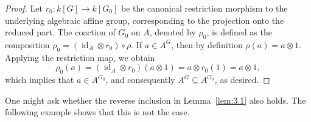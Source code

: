 \documentclass[11pt,a4paper,reqno,noamsfonts]{amsart}
\numberwithin{equation}{section}
\theoremstyle{definition}
\theoremstyle{remark}
\DeclareMathOperator{\id}{id}
\begin{document}
\begin{proof}
Let $r_0 \colon k[G] \to k[G_0]$ be the canonical restriction morphism to the underlying algebraic affine group, corresponding to the projection onto the reduced part. The coaction of $G_0$ on $A$, denoted by $\rho_0$, is defined as the composition $\rho_0 = (\id_A \otimes r_0) \circ \rho$. If $a \in A^{G}$, then by definition $\rho(a) = a \otimes 1$. Applying the restriction map, we obtain
$$
\rho_0(a) = (\id_A \otimes r_0)(a \otimes 1) = a \otimes r_0(1) = a \otimes 1,
$$
which implies that $a \in A^{G_0}$, and consequently $A^{G} \subseteq A^{G_0}$, as desired.
\end{proof}

One might ask whether the reverse inclusion in Lemma~\ref{lem:3.1} also holds. The following example shows that this is not the case.
\end{document}
